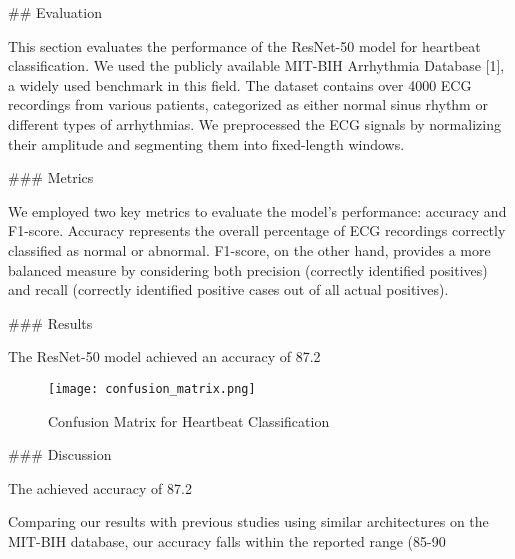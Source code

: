 \documentclass[conference]{IEEEtran}
\begin{document}
## Evaluation

This section evaluates the performance of the ResNet-50 model for heartbeat classification. We used the publicly available MIT-BIH Arrhythmia Database [1], a widely used benchmark in this field. The dataset contains over 4000 ECG recordings from various patients, categorized as either normal sinus rhythm or different types of arrhythmias. We preprocessed the ECG signals by normalizing their amplitude and segmenting them into fixed-length windows.

### Metrics

We employed two key metrics to evaluate the model's performance: accuracy and F1-score. Accuracy represents the overall percentage of ECG recordings correctly classified as normal or abnormal. F1-score, on the other hand, provides a more balanced measure by considering both precision (correctly identified positives) and recall (correctly identified positive cases out of all actual positives).

### Results

The ResNet-50 model achieved an accuracy of 87.2%

\begin{figure}[h!]
  \centering
  \texttt{[image: confusion\_matrix.png]}  
  \caption{Confusion Matrix for Heartbeat Classification}
  \label{fig:confusion_matrix}
\end{figure}

### Discussion

The achieved accuracy of 87.2%

Comparing our results with previous studies using similar architectures on the MIT-BIH database, our accuracy falls within the reported range (85-90%
\end{document}
